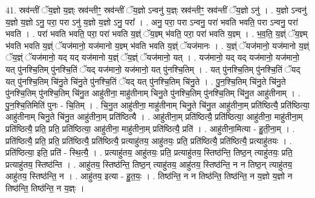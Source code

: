 \documentclass[17pt]{extarticle}
\begin{document}
41. स्रव॑न्तीं ॅय॒ज्ञो य॒ज्ञ्ः स्रव॑न्तीꣳ॒॒ स्रव॑न्तीं ॅय॒ज्ञो ऽन्वनु॑ य॒ज्ञ्ः स्रव॑न्तीꣳ॒॒ स्रव॑न्तीं ॅय॒ज्ञो ऽनु॑ । . य॒ज्ञो ऽन्वनु॑ य॒ज्ञो य॒ज्ञो ऽनु॒ परा॒ परा ऽनु॑ य॒ज्ञो य॒ज्ञो ऽनु॒ परा᳚ । . अनु॒ परा॒ परा ऽन्वनु॒ परा॑ भवति भवति॒ परा ऽन्वनु॒ परा॑ भवति । . परा॑ भवति भवति॒ परा॒ परा॑ भवति य॒ज्ञ्ं ॅय॒ज्ञ्म् भ॑वति॒ परा॒ परा॑ भवति य॒ज्ञ्म् । . भ॒व॒ति॒ य॒ज्ञ्ं ॅय॒ज्ञ्म् भ॑वति भवति य॒ज्ञ्ं ॅयज॑मानो॒ यज॑मानो य॒ज्ञ्म् भ॑वति भवति य॒ज्ञ्ं ॅयज॑मानः । . य॒ज्ञ्ं ॅयज॑मानो॒ यज॑मानो य॒ज्ञ्ं ॅय॒ज्ञ्ं ॅयज॑मानो॒ यद् यद् यज॑मानो य॒ज्ञ्ं ॅय॒ज्ञ्ं ॅयज॑मानो॒ यत् । . यज॑मानो॒ यद् यद् यज॑मानो॒ यज॑मानो॒ यत् पु॑नश्चि॒तिम् पु॑नश्चि॒तिं ॅयद् यज॑मानो॒ यज॑मानो॒ यत् पु॑नश्चि॒तिम् । . यत् पु॑नश्चि॒तिम् पु॑नश्चि॒तिं ॅयद् यत् पु॑नश्चि॒तिम् चि॑नु॒ते चि॑नु॒ते पु॑नश्चि॒तिं ॅयद् यत् पु॑नश्चि॒तिम् चि॑नु॒ते । . पु॒न॒श्चि॒तिम् चि॑नु॒ते चि॑नु॒ते पु॑नश्चि॒तिम् पु॑नश्चि॒तिम् चि॑नु॒त आहु॑तीना॒ माहु॑तीनाम् चिनु॒ते पु॑नश्चि॒तिम् पु॑नश्चि॒तिम् चि॑नु॒त आहु॑तीनाम् । . पु॒न॒श्चि॒तिमिति॑ पुनः - चि॒तिम् । . चि॒नु॒त आहु॑तीना॒ माहु॑तीनाम् चिनु॒ते चि॑नु॒त आहु॑तीना॒म् प्रति॑ष्ठित्यै॒ प्रति॑ष्ठित्या॒ आहु॑तीनाम् चिनु॒ते चि॑नु॒त आहु॑तीना॒म् प्रति॑ष्ठित्यै । . आहु॑तीना॒म् प्रति॑ष्ठित्यै॒ प्रति॑ष्ठित्या॒ आहु॑तीना॒ माहु॑तीना॒म् प्रति॑ष्ठित्यै॒ प्रति॒ प्रति॒ प्रति॑ष्ठित्या॒ आहु॑तीना॒ माहु॑तीना॒म् प्रति॑ष्ठित्यै॒ प्रति॑ । . आहु॑तीना॒मित्या - हु॒ती॒ना॒म् । . प्रति॑ष्ठित्यै॒ प्रति॒ प्रति॒ प्रति॑ष्ठित्यै॒ प्रति॑ष्ठित्यै॒ प्रत्याहु॑तय॒ आहु॑तयः॒ प्रति॒ प्रति॑ष्ठित्यै॒ प्रति॑ष्ठित्यै॒ प्रत्याहु॑तयः । . प्रति॑ष्ठित्या॒ इति॒ प्रति॑ - स्थि॒त्यै॒ । . प्रत्याहु॑तय॒ आहु॑तयः॒ प्रति॒ प्रत्याहु॑तय॒ स्तिष्ठ॑न्ति॒ तिष्ठ॒न् त्याहु॑तयः॒ प्रति॒ प्रत्याहु॑तय॒ स्तिष्ठ॑न्ति । . आहु॑तय॒ स्तिष्ठ॑न्ति॒ तिष्ठ॒न् त्याहु॑तय॒ आहु॑तय॒ स्तिष्ठ॑न्ति॒ न न तिष्ठ॒न् त्याहु॑तय॒ आहु॑तय॒ स्तिष्ठ॑न्ति॒ न । . आहु॑तय॒ इत्या - हु॒त॒यः॒ । . तिष्ठ॑न्ति॒ न न तिष्ठ॑न्ति॒ तिष्ठ॑न्ति॒ न य॒ज्ञो य॒ज्ञो न तिष्ठ॑न्ति॒ तिष्ठ॑न्ति॒ न य॒ज्ञ्ः । \newline
\pagebreak
{}
\end{document}
